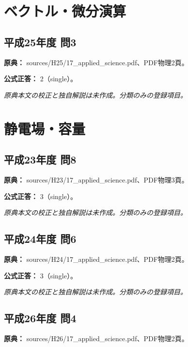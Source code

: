 \section{ベクトル・微分演算}

\subsection{平成25年度 問3}
\label{q:h25-reg-applied-03}

\noindent\textbf{原典：} sources/H25/17\_applied\_science.pdf、PDF物理2頁。

\textbf{公式正答：} 2（single）。

\par\textit{原典本文の校正と独自解説は未作成。分類のみの登録項目。}

\section{静電場・容量}

\subsection{平成23年度 問8}
\label{q:h23-reg-applied-08}

\noindent\textbf{原典：} sources/H23/17\_applied\_science.pdf、PDF物理3頁。

\textbf{公式正答：} 3（single）。

\par\textit{原典本文の校正と独自解説は未作成。分類のみの登録項目。}

\subsection{平成24年度 問6}
\label{q:h24-reg-applied-06}

\noindent\textbf{原典：} sources/H24/17\_applied\_science.pdf、PDF物理2頁。

\textbf{公式正答：} 3（single）。

\par\textit{原典本文の校正と独自解説は未作成。分類のみの登録項目。}

\subsection{平成26年度 問4}
\label{q:h26-reg-applied-04}

\noindent\textbf{原典：} sources/H26/17\_applied\_science.pdf、PDF物理2頁。

